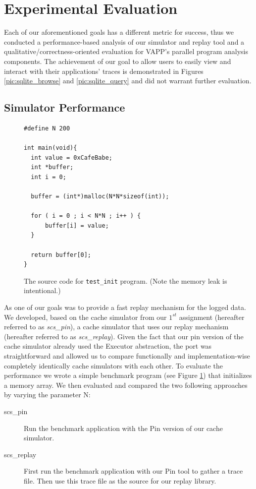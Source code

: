 \section{Experimental Evaluation}
Each of our aforementioned goals has a different metric
for success, thus we conducted a performance-based
analysis of our simulator and replay tool and a
qualitative/correctness-oriented evaluation for
VAPP's parallel program analysis components.  The achievement
of our goal to allow users to easily view and
interact with their applications' traces is demonstrated
in Figures \ref{pic:sqlite_browse} and \ref{pic:sqlite_query}
and did not warrant further evaluation.

\subsection{Simulator Performance}
\label{sec:sim_perf}

\begin{figure}
  \lstset{language=C, basicstyle=\small}
  \begin{lstlisting}
#define N 200

int main(void){
  int value = 0xCafeBabe;
  int *buffer;
  int i = 0;

  buffer = (int*)malloc(N*N*sizeof(int));

  for ( i = 0 ; i < N*N ; i++ ) {
      buffer[i] = value;
  }

  return buffer[0];
}
  \end{lstlisting}
  \caption{The source code for \texttt{test\_init} program. (Note the memory leak is intentional.)}
  \label{fig:test_init}
\end{figure}

As one of our goals was to provide a fast replay mechanism for the
logged data. We developed, based on the cache simulator from our
$1^{st}$ assignment (hereafter referred to as \emph{scs\_pin}), a cache
simulator that uses our replay mechanism (hereafter referred to as
\emph{scs\_replay}). Given the fact that our pin version of the cache
simulator already used the Executor abstraction, the port was straightforward
and allowed us to compare functionally and implementation-wise
completely identically cache simulators with each other. To evaluate
the performance we wrote a simple benchmark program (see Figure
\ref{fig:test_init}) that initializes a memory array. We then evaluated
and compared the two following approaches by varying the parameter N:

\begin{description}
  \item[scs\_pin] Run the benchmark application with the Pin version of
    our cache simulator.
  \item[scs\_replay] First run the benchmark application with our Pin
    tool to gather a trace file. Then use this trace file as the
    source for our replay library.
\end{description}

